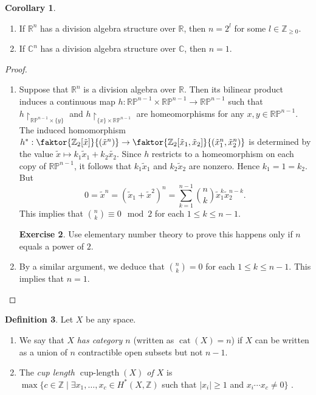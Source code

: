 \documentclass[10pt,letterpaper,cm]{nupset}
\theoremstyle{definition}
\newtheorem{definition}{Definition}[subsection]
\theoremstyle{theorem}
\newtheorem{corollary}[definition]{Corollary}
\newtheorem{exercise}[definition]{Exercise}
\theoremstyle{remark}
\newcommand{\C}{\mathbb C}
\newcommand{\R}{\mathbb{R}}
\newcommand{\RP}{\mathbb{RP}}
\newcommand{\Z}{\mathbb Z}
\newcommand{\1}{\mathbb{1}}
\newcommand{\0}{\vec 0}
\DeclareMathOperator{\clength}{cup{-}length}
\DeclareMathOperator{\cat}{cat}
\begin{document}
\begin{corollary} $ $
\begin{enumerate}
\item If $\R^n$ has a division algebra structure over $\R$, then $n =2^l$ for some $l\in \Z_{\geq 0}$. 
\item If $\C^n$ has a division algebra structure over $\C$, then $n=1$.
\end{enumerate}
\end{corollary}
\begin{proof} $ $
\begin{enumerate}
\item Suppose that $\R^n$ is a division algebra over $\R$. Then its bilinear product induces a continuous map $h: \RP^{n-1} \times \RP^{n-1} \to \RP^{n-1}$ such that $h\restriction_{\RP^{n-1} \times \{y\}}$ and $h\restriction_{\{x\} \times \RP^{n-1}}$ are homeomorphisms for any $x,y \in \RP^{n-1}$. The induced homomorphism $h^{\ast}: \faktor{\Z_2[\tilde{x}]}{(\tilde{x}^n)} \to  \faktor{\Z_2[\tilde{x}_1, \tilde{x}_2]}{(\tilde{x}_1^n, \tilde{x}_2^n)}$ is determined by the value $\tilde{x} \mapsto k_1 \tilde{x}_1 + k_2 \tilde{x_2}$. Since $h$ restricts to a homeomorphism on each copy of $\RP^{n-1}$, it follows that $k_1 \tilde{x}_1$ and $k_2\tilde{x}_2$ are nonzero. Hence $k_1 = 1 = k_2$. But $$0 = \tilde{x}^n = (\tilde{x}_1 + \tilde{x}^2)^n = \sum_{k=1}^{n-1} {n \choose k} \tilde{x}_1^k \tilde{x}_2^{n-k} .$$ This implies that ${n \choose k}\equiv 0 \mod 2$ for each $1\leq k \leq n-1$. 
\begin{exercise}
Use elementary number theory to prove this happens only if $n$ equals a power of $2$.
\end{exercise}
\item By a similar argument, we deduce that ${n \choose k} =  0$ for each $1\leq k \leq n-1$. This implies that $n=1$.
\end{enumerate}
\end{proof}

\begin{definition} Let $X$ be any space.
\begin{enumerate}
\item  We say that $X$ \textit{has category $n$} (written as $\cat(X) = n$) if $X$ can be written as a union of $n$ contractible open subsets but not $n-1$. 
\item The \textit{cup length $\clength(X)$ of $X$} is $ \max\{ c \in \Z \mid \exists x_1, \ldots, x_c \in H^{\ast}(X, \Z)$ such that $|x_i| \geq 1$ and $x_i\cdots x_c \ne 0\}$  .
\end{enumerate}
\end{definition}
\end{document}
